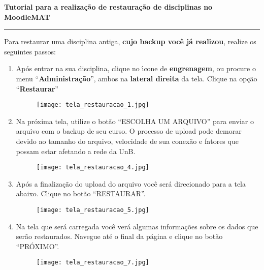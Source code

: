 \documentclass[12pt]{report}
\begin{document}
\newpage
\begin{center}
{\Large \textbf{Tutorial para a realiza\c{c}\~ao de restauração de disciplinas no MoodleMAT}}
\end{center}

\vspace{.3cm}

\hrule

\vspace{.7cm}
Para restaurar uma disciplina antiga, \textbf{cujo backup voc\^e j\'a realizou}, realize os seguintes passos: 

\begin{enumerate}[\bf 1)]
	\item Ap\'os entrar na sua disciplina, clique no {\'\i}cone de \textbf{engrenagem}, ou procure o menu ``\textbf{Administra\c{c}\~ao}'', ambos na \textbf{lateral direita} da tela. Clique na opção ``\textbf{Restaurar}''
	\begin{figure}[H]
    	\centering
    	\hspace*{-2.5cm}\texttt{[image: tela\_restauracao\_1.jpg]}
  	\end{figure}

  	\newpage

	\item Na pr\'oxima tela, utilize o bot\~ao ``ESCOLHA UM ARQUIVO'' para enviar o arquivo com o backup de seu curso. O processo de upload pode demorar devido ao tamanho do arquivo, velocidade de sua conex\~ao e fatores que possam estar afetando a rede da UnB.
	\begin{figure}[H]
    	\centering
    	\hspace*{-2.5cm}\texttt{[image: tela\_restauracao\_4.jpg]}
  	\end{figure}

  	\newpage

	\item Ap\'os a finaliza\c{c}\~ao do upload do arquivo voc\^e ser\'a direcionado para a tela abaixo. Clique no bot\~ao ``RESTAURAR''.
	\begin{figure}[H]
    	\centering
    	\hspace*{-2.5cm}\texttt{[image: tela\_restauracao\_5.jpg]}
  	\end{figure}

	\newpage

	\item  Na tela que ser\'a carregada voc\^e ver\'a algumas informa\c{c}\~oes sobre os dados que ser\~ao restaurados. Navegue at\'e o final da p\'agina e clique no bot\~ao ``PR\'OXIMO''.
	\begin{figure}[H]
    	\centering
    	\hspace*{-2.5cm}\texttt{[image: tela\_restauracao\_7.jpg]}
  	\end{figure}


\end{enumerate}
\end{document}
